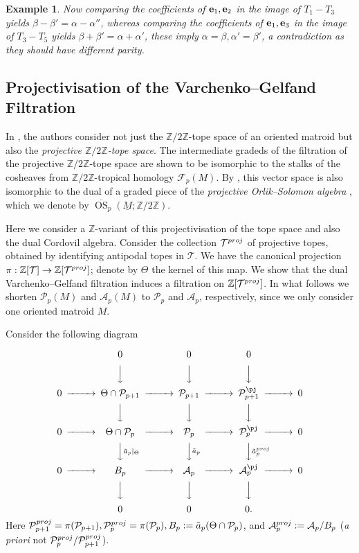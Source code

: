 \documentclass{amsart}
\newtheorem{example}[theorem]{Example}
\newcommand\Acal{{\mathcal A}}
\newcommand\Pcal{{\mathcal P}}
\newcommand\Tcal{{\mathcal T}}
\newcommand\ee{{\bf e}}
\newcommand\ZZ{{\mathbb Z}}
\newcommand\Ztwo{{\mathbb Z}/2{\mathbb Z}}
\newcommand\pj{{\rm proj}}
\DeclareMathOperator{\OS}{OS}
\begin{document}
{\begin{example}
Now comparing the coefficients of $\ee_1,\ee_2$ in the image of $T_1-T_3$ yields $\beta-\beta'=\alpha-\alpha''$, whereas comparing the coefficients of $\ee_1,\ee_3$ in the image of $T_3 - T_5$ yields $\beta+\beta'=\alpha+\alpha'$, these imply $\alpha=\beta,\alpha'=\beta'$, a contradiction as they should have different parity.
\end{example}

\subsection{Projectivisation of the Varchenko--Gelfand Filtration}

In \cite{RRS2, RS}, the authors consider not just the $\Ztwo$-tope space of an oriented matroid but also the {\em projective $\Ztwo$-tope space}. The intermediate gradeds of the filtration of the projective $\Ztwo$-tope space are shown to be isomorphic to the stalks of the cosheaves from $\Ztwo$-tropical homology $\mathcal{F}_p(M)$. 
By \cite{Zhar_OS}, this vector space is also isomorphic to the dual of a graded piece of the {\em projective Orlik--Solomon algebra} \cite{OS,Kawahara}, which we denote by $\overline{\OS}_p(\underline{M}; \Ztwo)$.

Here we consider a $\ZZ$-variant of this projectivisation of the tope space and also the dual Cordovil algebra. Consider the collection $\Tcal^\pj$ of projective topes, obtained by identifying antipodal topes in $\Tcal$. We have the canonical projection $\pi:\ZZ[\Tcal]\rightarrow\ZZ[\Tcal^\pj]$; denote by $\Theta$ the kernel of this map. 
We show that the dual Varchenko--Gelfand filtration induces a filtration on $\ZZ[\Tcal^\pj]$. In what follows we shorten 
$\Pcal_p(M)$ and $\Acal_p(M)$ to $\Pcal_p$ and $\Acal_p$, respectively, since we only consider one oriented matroid $M$. 

Consider the following diagram

$$
\begin{CD}
@. 0 @. 0 @. 0\\
@. @VVV @VVV @VVV\\
0@>>>\Theta\cap\Pcal_{p+1}@>>>\Pcal_{p+1}@>>>\Pcal_{p+1}^\pj@>>>0\\
@. @VVV @VVV @VVV\\
0@>>>\Theta\cap\Pcal_p@>>>\Pcal_p @>>>\Pcal_p^\pj@>>>0\\
@. @VV{\tilde{a}_p|_\Theta} V @VV{\tilde{a}_p}V @VV{\tilde{a}_p^\pj}V\\
0@>>> B_p @>>>\Acal_p@>>>\Acal_p^\pj@>>>0\\
@. @VVV @VVV @VVV\\
@. 0 @. 0 @. 0.\\
\end{CD}
$$
Here $\Pcal_{p+1}^\pj=\pi(\Pcal_{p+1}), \Pcal_p^\pj=\pi(\Pcal_p), B_p:=\tilde{a}_p(\Theta\cap\Pcal_p)$, and $\Acal_p^\pj:=\Acal_p/B_p$ ({\em a priori} not $\Pcal_p^\pj/\Pcal_{p+1}^\pj$).

}
\end{document}
